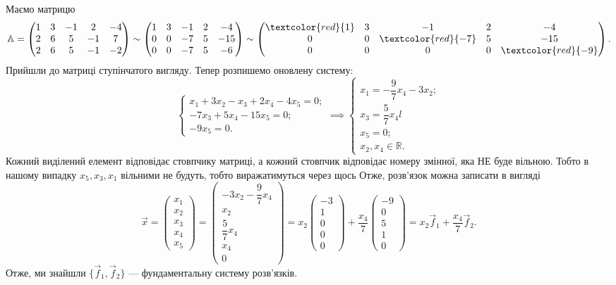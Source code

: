 \documentclass{math_library}
\begin{document}
\begin{example}
Маємо матрицю 
\[
\mathbb{A} = \begin{pmatrix}
1 & 3 & -1 & 2 & -4 \\
2 & 6 & 5 & -1 & 7 \\
2 & 6 & 5 & -1 & -2
\end{pmatrix} \sim \begin{pmatrix}
1 & 3 & -1 & 2 & -4 \\
0 & 0 & -7 & 5 & -15 \\
0 & 0 & -7 & 5 & -6
\end{pmatrix} \sim \begin{pmatrix}
\textcolor{red}{1} & 3 & -1 & 2 & -4 \\
0 & 0 & \textcolor{red}{-7} & 5 & -15 \\
0 & 0 & 0 & 0 & \textcolor{red}{-9}
\end{pmatrix}.
\]
Прийшли до матриці ступінчатого вигляду. Тепер розпишемо оновлену систему:
\[
\begin{cases}
x_1 + 3x_2 - x_3 + 2x_4 - 4x_5 = 0; \\
-7x_3 + 5x_4 -15x_5 = 0; \\
-9x_5 = 0.
\end{cases} \implies \begin{cases}
x_1 = -\dfrac{9}{7}x_4 - 3x_2; \\
x_3 = \dfrac{5}{7}x_4l \\
x_5 = 0; \\
x_2,x_4 \in \mathbb{R}.
\end{cases}
\]
Кожний виділений елемент відповідає стовпчику матриці, а кожний стовпчик відповідає номеру змінної, яка НЕ буде вільною. Тобто в нашому випадку $x_5,x_3,x_1$ вільними не будуть, тобто виражатимуться через щось
Отже, розв'язок можна записати в вигляді 
\[
\vec{x} = \begin{pmatrix}
x_1 \\ x_2 \\ x_3 \\ x_4 \\ x_5
\end{pmatrix} = \begin{pmatrix}
-3x_2 - \dfrac{9}{7}x_4 \\ x_2 \\ \dfrac{5}{7}x_4 \\ x_4 \\ 0
\end{pmatrix} = x_2 \begin{pmatrix}
-3 \\ 1 \\ 0 \\ 0 \\ 0
\end{pmatrix} + \dfrac{x_4}{7} \begin{pmatrix}
-9 \\ 0 \\ 5 \\ 1 \\ 0
\end{pmatrix} = x_2 \vec{f}_1 + \dfrac{x_4}{7} \vec{f}_2.
\]
Отже, ми знайшли $\{ \vec{f}_1, \vec{f}_2\}$ --- фундаментальну систему розв'язків.
\end{example}
\end{document}
